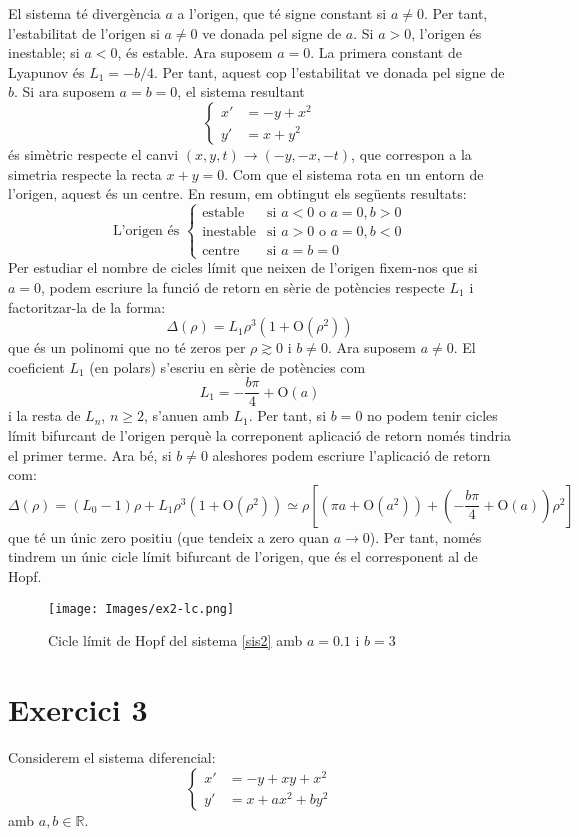 \documentclass[a4paper]{article}
\newcommand{\RR}{\ensuremath{\mathbb{R}}} %
\newcommand{\OO}{\mathrm{O}}
\theoremstyle{definition}
\begin{document}
El sistema té divergència $a$ a l'origen, que té signe constant si $a\ne 0$. Per tant, l'estabilitat de l'origen si $a\ne 0$ ve donada pel signe de $a$. Si $a>0$, l'origen és inestable; si $a<0$, és estable. Ara suposem $a=0$. La primera constant de Lyapunov és $L_1=-b/4$. Per tant, aquest cop l'estabilitat ve donada pel signe de $b$. Si ara suposem $a=b=0$, el sistema resultant
$$
  \left\{
  \begin{aligned}
    x' & =-y+x^2  \\
    y' & =x + y^2
  \end{aligned}
  \right.
$$
és simètric respecte el canvi $(x, y, t)\to(-y,-x,-t)$, que correspon a la simetria respecte la recta $x+y=0$. Com que el sistema rota en un entorn de l'origen, aquest és un centre. En resum, em obtingut els següents resultats:
$$\text{L'origen és }
  \begin{cases}
    \text{estable}   & \text{si } a < 0 \text{ o } a = 0, b>0  \\
    \text{inestable} & \text{si } a > 0  \text{ o } a = 0, b<0 \\
    \text{centre}    & \text{si } a = b= 0
  \end{cases}
$$
Per estudiar el nombre de cicles límit que neixen de l'origen fixem-nos que si $a=0$, podem escriure la funció de retorn en sèrie de potències respecte $L_1$ i factoritzar-la de la forma:
$$\Delta (\rho)=L_1\rho^3(1 + \OO(\rho^2))$$
que és un polinomi que no té zeros per $\rho\gtrsim 0$ i $b\ne 0$. Ara suposem $a \ne 0$. El coeficient $L_1$ (en polars) s'escriu en sèrie de potències com $$L_1=-\frac{b\pi}{4} + \OO(a)$$ i la resta de $L_n$, $n\geq 2$, s'anu\lgem en amb $L_1$. Per tant, si $b=0$ no podem tenir cicles límit bifurcant de l'origen perquè la correponent aplicació de retorn només tindria el primer terme. Ara bé, si $b\ne 0$ aleshores podem escriure l'aplicació de retorn com:
$$\Delta (\rho)=(L_0 - 1 ) \rho+ L_1\rho^3(1 + \OO(\rho^2))\simeq \rho\left[(\pi a +\OO(a^2)) + \left(-\frac{b\pi}{4}+ \OO(a)\right) \rho^2\right]$$ que té un únic zero positiu (que tendeix a zero quan $a\to 0$). Per tant, només tindrem un únic cicle límit bifurcant de l'origen, que és el corresponent al de Hopf.
\begin{figure}[ht]
  \centering
  \texttt{[image: Images/ex2-lc.png]}
  \caption{Cicle límit de Hopf del sistema \eqref{sis2} amb $a=0.1$ i $b=3$}
\end{figure}

\newpage
\section*{Exercici 3}
Considerem el sistema diferencial:
\begin{equation}\label{sis3}
  \left\{
  \begin{aligned}
    x' & =-y+xy+x^2      \\
    y' & =x + ax^2 +by^2
  \end{aligned}
  \right.
\end{equation}
amb $a,b\in\RR$.
\end{document}
